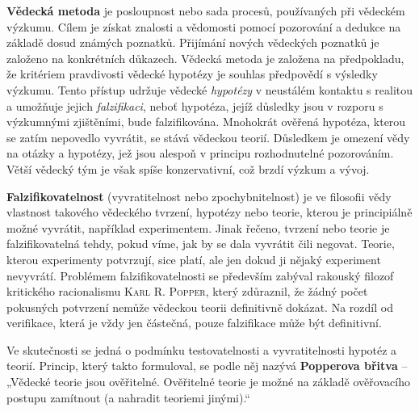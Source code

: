       \begin{tcnote}
        \textbf{Vědecká metoda} je posloupnost nebo sada procesů, používaných při vědeckém výzkumu.
        Cílem je získat znalosti a vědomosti pomocí pozorování a dedukce na základě dosud známých
        poznatků. Přijímání nových vědeckých poznatků je založeno na konkrétních důkazech. Vědecká
        metoda je založena na předpokladu, že kritériem pravdivosti vědecké hypotézy je souhlas
        předpovědí s výsledky výzkumu. Tento přístup udržuje vědecké \emph{hypotézy} v neustálém
        kontaktu s realitou a umožňuje jejich \emph{falzifikaci}, neboť hypotéza, jejíž důsledky
        jsou v rozporu s výzkumnými zjištěními, bude falzifikována. Mnohokrát ověřená hypotéza,
        kterou se zatím nepovedlo vyvrátit, se stává vědeckou teorií. Důsledkem je omezení vědy na
        otázky a hypotézy, jež jsou alespoň v principu rozhodnutelné pozorováním. Větší vědecký tým
        je však spíše konzervativní, což brzdí výzkum a vývoj.

        {\centering
        \captionsetup{type=figure}
        \label{fyz:fig0924}
        \par}

        \textbf{Falzifikovatelnost} (vyvratitelnost nebo zpochybnitelnost) je ve filosofii vědy
        vlastnost takového vědeckého tvrzení, hypotézy nebo teorie, kterou je principiálně možné
        vyvrátit, například experimentem. Jinak řečeno, tvrzení nebo teorie je falzifikovatelná
        tehdy, pokud víme, jak by se dala vyvrátit čili negovat. Teorie, kterou experimenty
        potvrzují, sice platí, ale jen dokud ji nějaký experiment nevyvrátí. Problémem
        falzifikovatelnosti se především zabýval rakouský filozof kritického racionalismu
        \textsc{Karl R. Popper}, který zdůraznil, že žádný počet pokusných potvrzení nemůže vědeckou
        teorii definitivně dokázat. Na rozdíl od verifikace, která je vždy jen částečná, pouze
        falzifikace může být definitivní.

        Ve skutečnosti se jedná o podmínku testovatelnosti a vyvratitelnosti hypotéz a teorií.
        Princip, který takto formuloval, se podle něj nazývá \textbf{Popperova břitva} – „Vědecké
        teorie jsou ověřitelné. Ověřitelné teorie je možné na základě ověřovacího postupu zamítnout
        (a nahradit teoriemi jinými).“


\end{tcnote}

